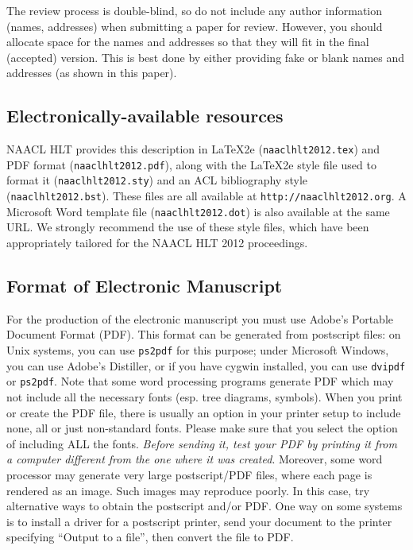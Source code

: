 \documentclass[11pt,letterpaper]{article}
\begin{document}
The review process is double-blind, so do not include any author information (names, addresses) when submitting a paper for review.  However, you should allocate space for the names and addresses so that they will fit in the final (accepted) version.  This is best done by either providing fake or blank names and addresses (as shown in this paper).

\subsection{Electronically-available resources}

NAACL HLT provides this description in \LaTeX2e{} ({\tt naaclhlt2012.tex}) and PDF
format ({\tt naaclhlt2012.pdf}), along with the \LaTeX2e{} style file used to
format it ({\tt naaclhlt2012.sty}) and an ACL bibliography style ({\tt naaclhlt2012.bst}).
These files are all available at
{\tt http://naaclhlt2012.org}.  A Microsoft Word
template file ({\tt naaclhlt2012.dot}) is also available at the same URL. We
strongly recommend the use of these style files, which have been
appropriately tailored for the NAACL HLT 2012 proceedings.


\subsection{Format of Electronic Manuscript}
\label{sect:pdf}

For the production of the electronic manuscript you must use Adobe's
Portable Document Format (PDF). This format can be generated from
postscript files: on Unix systems, you can use {\tt ps2pdf} for this
purpose; under Microsoft Windows, you can use Adobe's Distiller, or
if you have cygwin installed, you can use {\tt dvipdf} or
{\tt ps2pdf}.  Note 
that some word processing programs generate PDF which may not include
all the necessary fonts (esp. tree diagrams, symbols). When you print
or create the PDF file, there is usually an option in your printer
setup to include none, all or just non-standard fonts.  Please make
sure that you select the option of including ALL the fonts.  {\em
  Before sending it, test your {\/\em PDF} by printing it from a
  computer different from the one where it was created}. Moreover,
some word processor may generate very large postscript/PDF files,
where each page is rendered as an image. Such images may reproduce
poorly.  In this case, try alternative ways to obtain the postscript
and/or PDF.  One way on some systems is to install a driver for a
postscript printer, send your document to the printer specifying
``Output to a file'', then convert the file to PDF.
\end{document}
